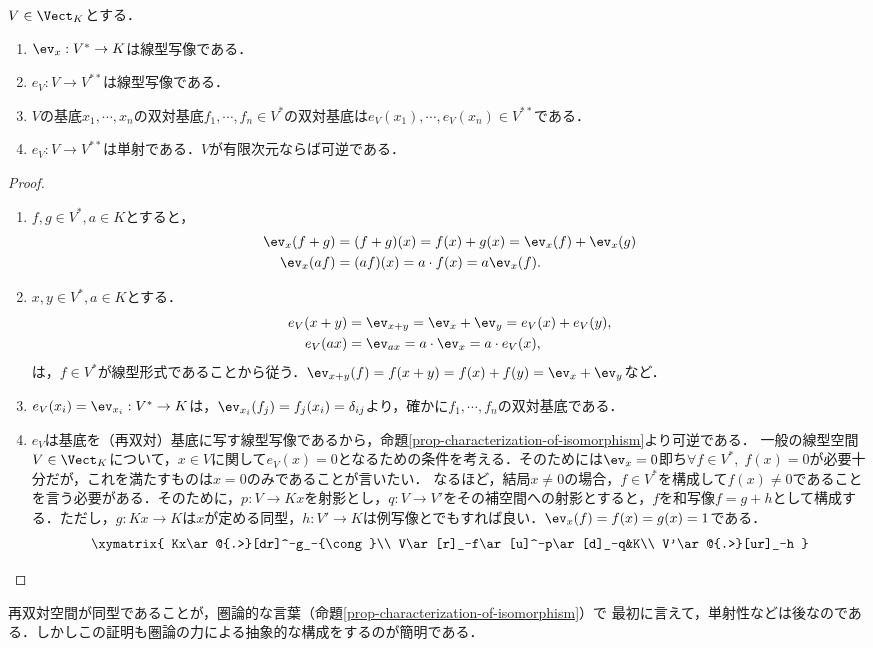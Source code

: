 \documentclass[uplatex, dvipdfmx]{jsreport}
\begin{document}
\begin{proposition}\label{prop-eV-is-monic}
    $V\in\Vect_K$とする．
    \begin{enumerate}
        \item $\ev_x:V^*\to K$は線型写像である．
        \item $e_V:V\to V^{**}$は線型写像である．
        \item $V$の基底$x_1,\cdots,x_n$の双対基底$f_1,\cdots,f_n\in V^*$の双対基底は$e_V(x_1),\cdots,e_V(x_n)\in V^{**}$である．
        \item $e_V:V\to V^{**}$は単射である．$V$が有限次元ならば可逆である．
    \end{enumerate}
\end{proposition}
\begin{proof}\mbox{}
    \begin{enumerate}
        \item $f,g\in V^*,a\in K$とすると，\begin{align*}
            \ev_x(f+g)&=(f+g)(x)=f(x)+g(x)=\ev_x(f)+\ev_x(g)\\
            \ev_x(af)&=(af)(x)=a\cdot f(x)=a\ev_x(f).
        \end{align*}
        \item $x,y\in V^*,a\in K$とする．\begin{align*}
            e_V(x+y)&=\ev_{x+y}=\ev_x+\ev_y=e_V(x)+e_V(y),\\
            e_V(ax)&=\ev_{ax}=a\cdot\ev_x=a\cdot e_V(x),
        \end{align*}
        は，$f\in V^*$が線型形式であることから従う．$\ev_{x+y}(f)=f(x+y)=f(x)+f(y)=\ev_x+\ev_y$など．
        \item $e_V(x_i)=\ev_{x_i}:V^*\to K$は，$\ev_{x_i}(f_j)=f_j(x_i)=\delta_{ij}$より，確かに$f_1,\cdots,f_n$の双対基底である．
        \item $e_V$は基底を（再双対）基底に写す線型写像であるから，命題\ref{prop-characterization-of-isomorphism}より可逆である．
        一般の線型空間$V\in\Vect_K$について，$x\in V$に関して$e_V(x)=0$となるための条件を考える．そのためには$\ev_x=0$即ち$\forall f\in V^*,\;f(x)=0$が必要十分だが，これを満たすものは$x=0$のみであることが言いたい．
        なるほど，結局$x\ne 0$の場合，$f\in V^*$を構成して$f(x)\ne 0$であることを言う必要がある．そのために，$p:V\to Kx$を射影とし，$q:V\to V'$をその補空間への射影とすると，$f$を和写像$f=g+h$として構成する．ただし，$g:Kx\to K$は$x$が定める同型，$h:V'\to K$は例写像とでもすれば良い．$\ev_x(f)=f(x)=g(x)=1$である．
        \[\xymatrix{
            Kx\ar@{.>}[dr]^-g_-{\cong}\\
            V\ar[r]_-f\ar[u]^-p\ar[d]_-q&K\\
            V'\ar@{.>}[ur]_-h
        }\]
    \end{enumerate}
\end{proof}
\begin{remark}[どうして線型代数ではこんなにも圏論的視点が大事なのか？]
    再双対空間が同型であることが，圏論的な言葉（命題\ref{prop-characterization-of-isomorphism}）で
    最初に言えて，単射性などは後なのである．しかしこの証明も圏論の力による抽象的な構成をするのが簡明である．
\end{remark}
\end{document}
